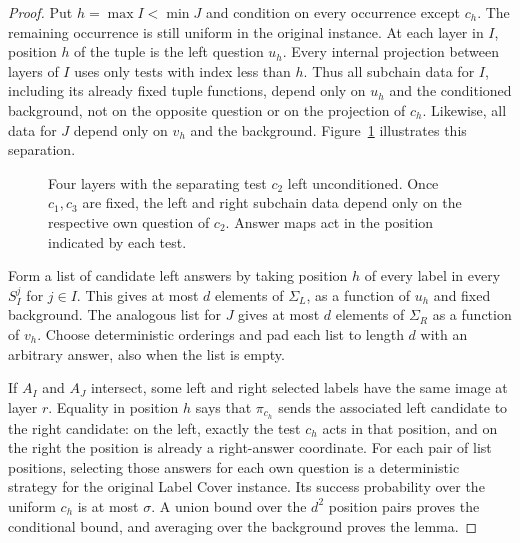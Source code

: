 \begin{proof}
Put $h=\max I<\min J$ and condition on every occurrence except $c_h$.
The remaining occurrence is still uniform in the original instance.
At each layer in $I$, position $h$ of the tuple is the left question
$u_h$. Every internal projection between layers of $I$ uses only
tests with index less than $h$. Thus all subchain data for $I$,
including its already fixed tuple functions, depend only on $u_h$
and the conditioned background, not on the opposite question or on
the projection of $c_h$.
Likewise, all data for $J$ depend only on $v_h$ and the background.
Figure~\ref{fig:locality} illustrates this separation.

\begin{figure}[t]
\centering
{}
\caption{Four layers with the separating test $c_2$ left unconditioned.
Once $c_1,c_3$ are fixed, the left and right subchain data depend only
on the respective own question of $c_2$. Answer maps act in the position
indicated by each test.}
\label{fig:locality}
\end{figure}

Form a list of candidate left answers by taking position $h$
of every label in every $S_I^j$ for $j\in I$.
This gives at most $d$ elements of $\Sigma_L$, as a function of $u_h$
and fixed background. The analogous list for $J$ gives at most $d$
elements of $\Sigma_R$ as a function of $v_h$.
Choose deterministic orderings and pad each list to length $d$
with an arbitrary answer, also when the list is empty.

If $A_I$ and $A_J$ intersect, some left and right selected labels have
the same image at layer $r$. Equality in position $h$ says that
$\pi_{c_h}$ sends the associated left candidate to the right candidate:
on the left, exactly the test $c_h$ acts in that position, and on the
right the position is already a right-answer coordinate.
For each pair of list positions, selecting those answers for each
own question is a deterministic strategy for the original Label Cover
instance. Its success probability over the uniform $c_h$ is at most
$\sigma$. A union bound over the $d^2$ position pairs proves the
conditional bound, and averaging over the background proves the lemma.
\end{proof}

